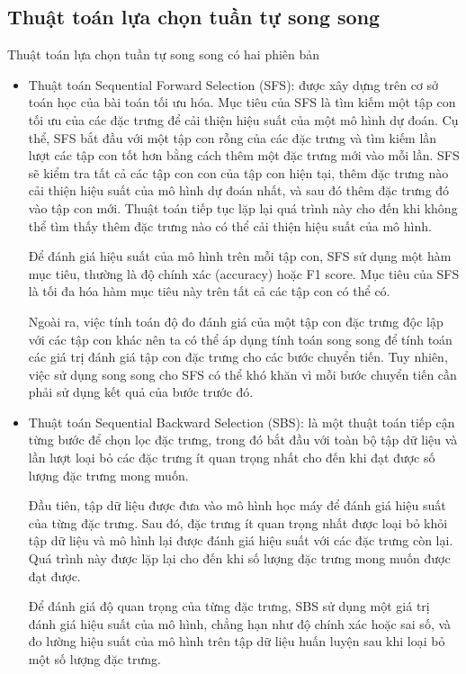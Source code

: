 \subsection[PSFS và PSBS]{Thuật toán lựa chọn tuần tự song song \cite{scikit-learn}}
Thuật toán lựa chọn tuần tự song song có hai phiên bản
\begin{itemize}
	\item Thuật toán Sequential Forward Selection (SFS): được xây dựng trên cơ sở toán học của bài toán tối ưu hóa. Mục tiêu của SFS là tìm kiếm một tập con tối ưu của các đặc trưng để cải thiện hiệu suất của một mô hình dự đoán. Cụ thể, SFS bắt đầu với một tập con rỗng của các đặc trưng và tìm kiếm lần lượt các tập con tốt hơn bằng cách thêm một đặc trưng mới vào mỗi lần. SFS sẽ kiểm tra tất cả các tập con con của tập con hiện tại, thêm đặc trưng nào cải thiện hiệu suất của mô hình dự đoán nhất, và sau đó thêm đặc trưng đó vào tập con mới. Thuật toán tiếp tục lặp lại quá trình này cho đến khi không thể tìm thấy thêm đặc trưng nào có thể cải thiện hiệu suất của mô hình.
	
	Để đánh giá hiệu suất của mô hình trên mỗi tập con, SFS sử dụng một hàm mục tiêu, thường là độ chính xác (accuracy) hoặc F1 score. Mục tiêu của SFS là tối đa hóa hàm mục tiêu này trên tất cả các tập con có thể có.
	
	Ngoài ra, việc tính toán độ đo đánh giá của một tập con đặc trưng độc lập với các tập con khác nên ta có thể áp dụng tính toán song song để tính toán các giá trị đánh giá tập con đặc trưng cho các bước chuyển tiến. Tuy nhiên, việc sử dụng song song cho SFS có thể khó khăn vì mỗi bước chuyển tiến cần phải sử dụng kết quả của bước trước đó.
	\item Thuật toán Sequential Backward Selection (SBS): là một thuật toán tiếp cận từng bước để chọn lọc đặc trưng, trong đó bắt đầu với toàn bộ tập dữ liệu và lần lượt loại bỏ các đặc trưng ít quan trọng nhất cho đến khi đạt được số lượng đặc trưng mong muốn.
	
	Đầu tiên, tập dữ liệu được đưa vào mô hình học máy để đánh giá hiệu suất của từng đặc trưng. Sau đó, đặc trưng ít quan trọng nhất được loại bỏ khỏi tập dữ liệu và mô hình lại được đánh giá hiệu suất với các đặc trưng còn lại. Quá trình này được lặp lại cho đến khi số lượng đặc trưng mong muốn được đạt được.
	
	Để đánh giá độ quan trọng của từng đặc trưng, SBS sử dụng một giá trị đánh giá hiệu suất của mô hình, chẳng hạn như độ chính xác hoặc sai số, và đo lường hiệu suất của mô hình trên tập dữ liệu huấn luyện sau khi loại bỏ một số lượng đặc trưng.
	

\end{itemize}
